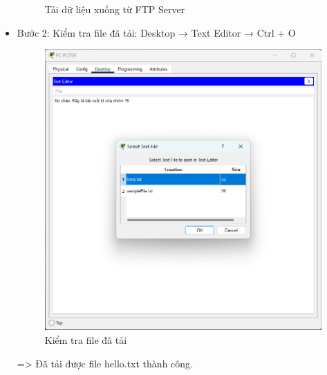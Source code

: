 \documentclass[12pt, a4paper]{article}
\begin{document}
\begin{flushleft}
\begin{itemize}[leftmargin=0.75cm]
\begin{figure}[H]
				\caption{Tải dữ liệu xuống từ FTP Server}
			\end{figure}
			\newpage
			\item Bước 2: Kiểm tra file đã tải: Desktop → Text Editor → Ctrl + O
			\begin{figure}[H]
				\centering
				\includegraphics[width=1\textwidth]{data_installcompletely_01.jpg}
				\caption{Kiểm tra file đã tải}
			\end{figure}
			=> Đã tải được file hello.txt thành công.
		\end{itemize}
	\end{flushleft}
	\newpage
\end{document}
